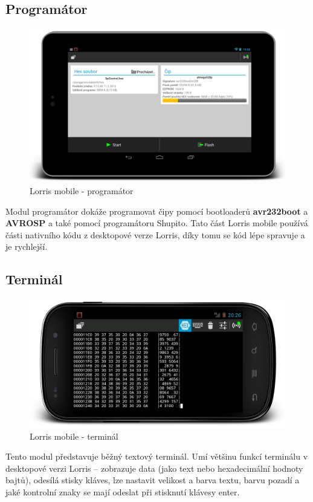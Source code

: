 \documentclass[12pt, a4paper, oneside]{article}
\begin{document}
\subsection{Programátor}
\begin{figure}[H]
\begin{center}
\includegraphics[width=\textwidth]{img/mobile_programmer.png}
\caption{Lorris mobile - programátor}
\end{center}
\end{figure}
Modul programátor dokáže programovat čipy pomocí bootloaderů {\bf avr232boot} a {\bf AVROSP} a také pomocí programátoru Shupito.
Tato část Lorris mobile používá části nativního kódu z desktopové verze Lorris, díky tomu se kód lépe spravuje a je rychlejší.

\subsection{Terminál}
\begin{figure}[H]
\begin{center}
\includegraphics[width=\textwidth]{img/mobile_term.png}
\caption{Lorris mobile - terminál}
\end{center}
\end{figure}
Tento modul představuje běžný textový terminál. Umí většinu funkcí terminálu v desktopové verzi Lorris -- zobrazuje data (jako text nebo hexadecimální hodnoty bajtů), odesílá stisky kláves, lze nastavit velikost a barva textu, barvu pozadí a jaké kontrolní znaky se mají odeslat při stisknutí klávesy enter. 
\end{document}
